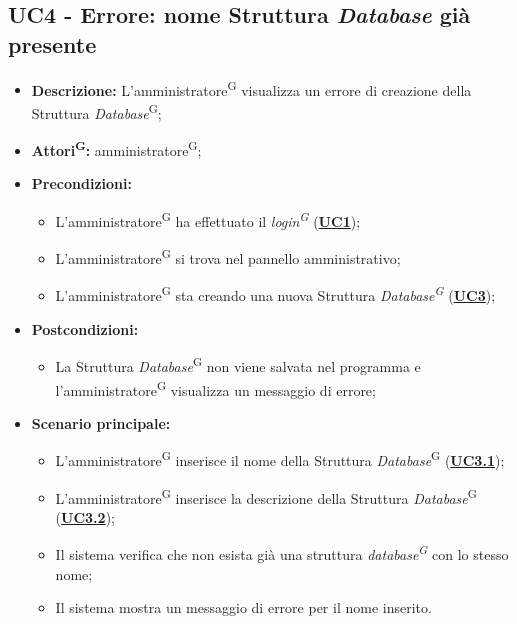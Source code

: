 \subsection{UC4 - Errore: nome Struttura \textit{Database} già presente}
\label{sec:UC4}
\begin{itemize}
	\item \textbf{Descrizione:} L’amministratore\textsuperscript{G} visualizza un errore di creazione della Struttura \textit{Database}\textsuperscript{G};
	\item \textbf{Attori\textsuperscript{G}:} amministratore\textsuperscript{G};
	\item \textbf{Precondizioni:} 
	\begin{itemize}
		\item L’amministratore\textsuperscript{G} ha effettuato il \textit{login\textsuperscript{G}} (\hyperref[sec:UC1]{\textbf{UC1}});
		\item L’amministratore\textsuperscript{G} si trova nel pannello amministrativo;
		\item L’amministratore\textsuperscript{G} sta creando una nuova Struttura \textit{Database\textsuperscript{G}} (\hyperref[sec:UC3]{\textbf{UC3}});
	\end{itemize}
	\item \textbf{Postcondizioni:} 
	\begin{itemize}
		\item La Struttura \textit{Database}\textsuperscript{G} non viene salvata nel programma e l'amministratore\textsuperscript{G} visualizza un messaggio di errore;
	\end{itemize}
	\item \textbf{Scenario principale:} 
	\begin{itemize}
		\item L’amministratore\textsuperscript{G} inserisce il nome della Struttura \textit{Database}\textsuperscript{G} (\hyperref[sec:UC3.1]{\textbf{UC3.1}});
		\item L’amministratore\textsuperscript{G} inserisce la descrizione della Struttura \textit{Database}\textsuperscript{G}  (\hyperref[sec:UC3.2]{\textbf{UC3.2}});
		\item Il sistema verifica che non esista già una struttura \textit{database\textsuperscript{G}} con lo stesso nome;
		\item Il sistema mostra un messaggio di errore per il nome inserito.
	\end{itemize}
\end{itemize}

